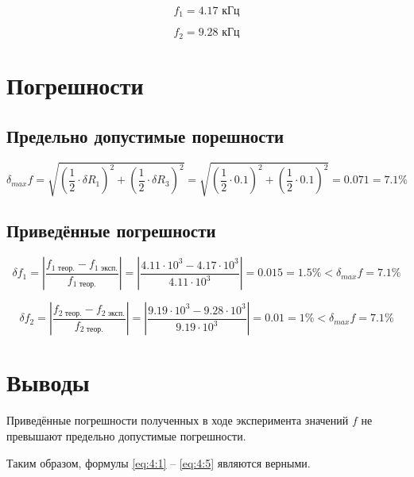 \begin{displaymath}
	f_1 = 4.17 \text{ кГц}
\end{displaymath}

\begin{displaymath}
	f_2 = 9.28 \text{ кГц}
\end{displaymath}

\section{Погрешности}

\subsection{Предельно допустимые порешности}

\begin{displaymath}
\delta_{max} f = \sqrt{\left(\frac{1}{2} \cdot \delta R_1 \right)^2 + \left(\frac{1}{2} \cdot \delta R_3 \right)^2} = \sqrt{\left(\frac{1}{2} \cdot 0.1 \right)^2 + \left(\frac{1}{2} \cdot 0.1 \right)^2} = 0.071 = 7.1\%
\end{displaymath}

\subsection{Приведённые погрешности}

\begin{displaymath}
	\delta f_1 = \left|\frac{f_\text{1 теор.} - f_\text{1 эксп.}}{f_\text{1 теор.}} \right| = \left|\frac{4.11 \cdot 10^3 - 4.17 \cdot 10^3}{4.11 \cdot 10^3}\right| = 0.015 = 1.5\% < \delta_{max} f = 7.1\%
\end{displaymath}

\begin{displaymath}
	\delta f_2 = \left|\frac{f_\text{2 теор.} - f_\text{2 эксп.}}{f_\text{2 теор.}} \right| = \left|\frac{9.19 \cdot 10^3 - 9.28 \cdot 10^3}{9.19 \cdot 10^3}\right| = 0.01 = 1\% < \delta_{max} f = 7.1\%
\end{displaymath}

\section{Выводы}

Приведённые погрешности полученных в ходе эксперимента значений $f$ не превышают предельно допустимые погрешности.

Таким образом, формулы \ref{eq:4:1} -- \ref{eq:4:5} являются верными.

